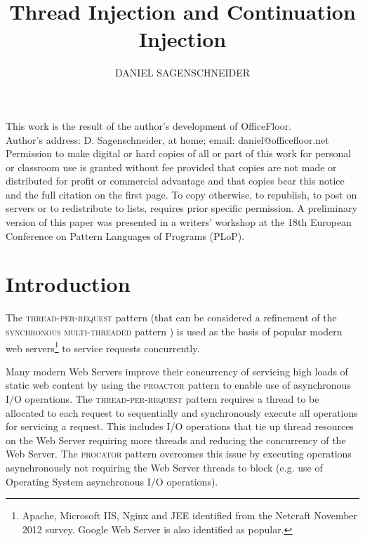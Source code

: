 \documentclass[prodmode]{style/acmlarge}
\title{Thread Injection and Continuation Injection}
\author{DANIEL SAGENSCHNEIDER \affil{daniel@officefloor.net}}
\begin{document}
\begin{bottomstuff}
This work is the result of the author's development of OfficeFloor.\\
Author's address: D. Sagenschneider, at home; email: daniel@officefloor.net\\

Permission to make digital or hard copies of all or part of this work for
personal or classroom use is granted without fee provided that copies are not
made or distributed for profit or commercial advantage and that copies bear this
notice and the full citation on the first page. To copy otherwise, to republish,
to post on servers or to redistribute to lists, requires prior specific
permission. A preliminary version of this paper was presented in a writers'
workshop at the 18th European Conference on Pattern Languages of Programs
(PLoP).
\end{bottomstuff}

\maketitle



\section{Introduction}

The \textsc{thread-per-request} pattern \cite{thread-per-request} (that can be
considered a refinement of the \textsc{synchronous multi-threaded} pattern
\cite{proactor}) is used as the basis of popular modern web
servers\footnote{Apache, Microsoft IIS, Nginx and JEE identified from the
Netcraft November 2012 survey.  Google Web Server is also identified as
popular.} to service requests concurrently.

Many modern Web Servers improve their concurrency of servicing high loads of
static web content by using the \textsc{proactor} pattern \cite{proactor} to
enable use of asynchronous I/O operations.  The \textsc{thread-per-request}
pattern requires a thread to be allocated to each request to sequentially and
synchronously execute all operations for servicing a request.  This includes I/O
operations that tie up thread resources on the Web Server requiring more threads
and reducing the concurrency of the Web Server.  The \textsc{procator} pattern
overcomes this issue by executing operations asynchronously not requiring the
Web Server threads to block (e.g. use of Operating System asynchronous I/O
operations).
\end{document}
